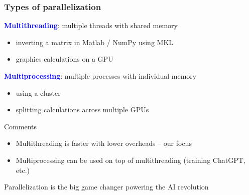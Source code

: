 \documentclass[
    xcolor={svgnames,dvipsnames},
    hyperref={colorlinks, citecolor=DeepPink4, linkcolor=DarkRed, urlcolor=DarkBlue}
    ]{beamer}  %
\newcommand{\navy}[1]{\textcolor{Blue}{\bf #1}}
\newcommand{\1}{\mathbbm 1}
\begin{document}
\begin{frame}
    \frametitle{Types of parallelization}

    \navy{Multithreading}: multiple threads with shared memory

    \begin{itemize}
        \item inverting a matrix in Matlab / NumPy using MKL
        \item graphics calculations on a GPU
    \end{itemize}

    \navy{Multiprocessing}: multiple processes with individual memory

    \begin{itemize}
        \item using a cluster 
        \item splitting calculations across multiple GPUs
    \end{itemize}

    Comments

    \begin{itemize}
        \item Multithreading is faster with lower overheads -- our focus
        \item Multiprocessing can be used on top of multithreading (training ChatGPT, etc.)
    \end{itemize}

\end{frame}


\begin{frame}

    Parallelization is the big game changer powering the AI revolution   

    \begin{figure}
       \begin{center}
       \end{center}
    \end{figure}

\end{frame}
\end{document}

